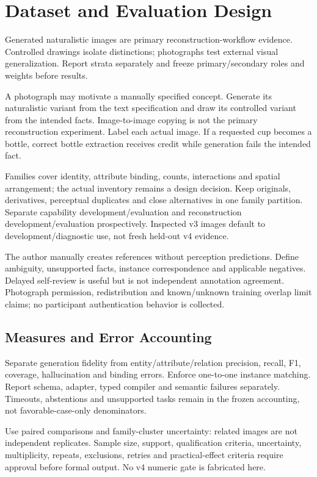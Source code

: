 \documentclass[compsoc,conference,a4paper,10pt,times]{IEEEtran}
\begin{document}
\section{Dataset and Evaluation Design}
\label{sec:evaluation}
Generated naturalistic images are primary reconstruction-workflow evidence. Controlled drawings isolate distinctions; photographs test external visual generalization. Report strata separately and freeze primary/secondary roles and weights before results.

A photograph may motivate a manually specified concept. Generate its naturalistic variant from the text specification and draw its controlled variant from the intended facts. Image-to-image copying is not the primary reconstruction experiment. Label each actual image. If a requested cup becomes a bottle, correct bottle extraction receives credit while generation fails the intended fact.

Families cover identity, attribute binding, counts, interactions and spatial arrangement; the actual inventory remains a design decision. Keep originals, derivatives, perceptual duplicates and close alternatives in one family partition. Separate capability development/evaluation and reconstruction development/evaluation prospectively. Inspected v3 images default to development/diagnostic use, not fresh held-out v4 evidence.

The author manually creates references without perception predictions. Define ambiguity, unsupported facts, instance correspondence and applicable negatives. Delayed self-review is useful but is not independent annotation agreement. Photograph permission, redistribution and known/unknown training overlap limit claims; no participant authentication behavior is collected.

\subsection{Measures and Error Accounting}
Separate generation fidelity from entity/attribute/relation precision, recall, F1, coverage, hallucination and binding errors. Enforce one-to-one instance matching. Report schema, adapter, typed compiler and semantic failures separately. Timeouts, abstentions and unsupported tasks remain in the frozen accounting, not favorable-case-only denominators.

Use paired comparisons and family-cluster uncertainty: related images are not independent replicates. Sample size, support, qualification criteria, uncertainty, multiplicity, repeats, exclusions, retries and practical-effect criteria require approval before formal output. No v4 numeric gate is fabricated here.
\end{document}

